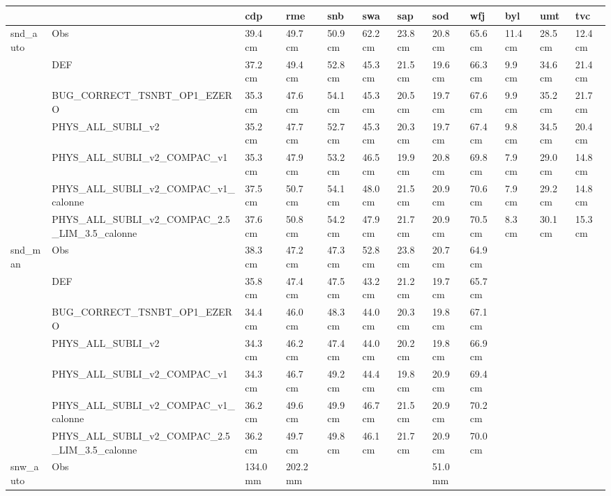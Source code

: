 \begin{tabular}{llllllllllll}
\toprule
 &  & cdp & rme & snb & swa & sap & sod & wfj & byl & umt & tvc \\
\midrule
\multirow[t]{7}{*}{snd_auto} & Obs & 39.4 cm & 49.7 cm & 50.9 cm & 62.2 cm & 23.8 cm & 20.8 cm & 65.6 cm & 11.4 cm & 28.5 cm & 12.4 cm \\
 & DEF & 37.2 cm & 49.4 cm & 52.8 cm & 45.3 cm & 21.5 cm & 19.6 cm & 66.3 cm & 9.9 cm & 34.6 cm & 21.4 cm \\
 & BUG_CORRECT_TSNBT_OP1_EZERO & 35.3 cm & 47.6 cm & 54.1 cm & 45.3 cm & 20.5 cm & 19.7 cm & 67.6 cm & 9.9 cm & 35.2 cm & 21.7 cm \\
 & PHYS_ALL_SUBLI_v2 & 35.2 cm & 47.7 cm & 52.7 cm & 45.3 cm & 20.3 cm & 19.7 cm & 67.4 cm & 9.8 cm & 34.5 cm & 20.4 cm \\
 & PHYS_ALL_SUBLI_v2_COMPAC_v1 & 35.3 cm & 47.9 cm & 53.2 cm & 46.5 cm & 19.9 cm & 20.8 cm & 69.8 cm & 7.9 cm & 29.0 cm & 14.8 cm \\
 & PHYS_ALL_SUBLI_v2_COMPAC_v1_calonne & 37.5 cm & 50.7 cm & 54.1 cm & 48.0 cm & 21.5 cm & 20.9 cm & 70.6 cm & 7.9 cm & 29.2 cm & 14.8 cm \\
 & PHYS_ALL_SUBLI_v2_COMPAC_2.5_LIM_3.5_calonne & 37.6 cm & 50.8 cm & 54.2 cm & 47.9 cm & 21.7 cm & 20.9 cm & 70.5 cm & 8.3 cm & 30.1 cm & 15.3 cm \\
\cline{1-12}
\multirow[t]{7}{*}{snd_man} & Obs & 38.3 cm & 47.2 cm & 47.3 cm & 52.8 cm & 23.8 cm & 20.7 cm & 64.9 cm &  &  &  \\
 & DEF & 35.8 cm & 47.4 cm & 47.5 cm & 43.2 cm & 21.2 cm & 19.7 cm & 65.7 cm &  &  &  \\
 & BUG_CORRECT_TSNBT_OP1_EZERO & 34.4 cm & 46.0 cm & 48.3 cm & 44.0 cm & 20.3 cm & 19.8 cm & 67.1 cm &  &  &  \\
 & PHYS_ALL_SUBLI_v2 & 34.3 cm & 46.2 cm & 47.4 cm & 44.0 cm & 20.2 cm & 19.8 cm & 66.9 cm &  &  &  \\
 & PHYS_ALL_SUBLI_v2_COMPAC_v1 & 34.3 cm & 46.7 cm & 49.2 cm & 44.4 cm & 19.8 cm & 20.9 cm & 69.4 cm &  &  &  \\
 & PHYS_ALL_SUBLI_v2_COMPAC_v1_calonne & 36.2 cm & 49.6 cm & 49.9 cm & 46.7 cm & 21.5 cm & 20.9 cm & 70.2 cm &  &  &  \\
 & PHYS_ALL_SUBLI_v2_COMPAC_2.5_LIM_3.5_calonne & 36.2 cm & 49.7 cm & 49.8 cm & 46.1 cm & 21.7 cm & 20.9 cm & 70.0 cm &  &  &  \\
\cline{1-12}
\multirow[t]{7}{*}{snw_auto} & Obs & 134.0 mm & 202.2 mm &  &  &  & 51.0 mm &  &  &  &  \\

\end{tabular}
